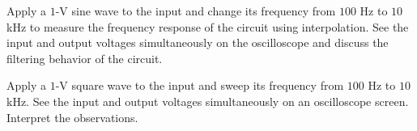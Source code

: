 \documentclass[11pt]{article}
\begin{document}
\begin{question}
    \begin{subquestion}{Apply a $1$-V sine wave to the input and change its frequency from $100$ Hz to $10$ kHz to measure the frequency response of the circuit using interpolation. See the input and output voltages simultaneously on the oscilloscope and discuss the filtering behavior of the circuit.}
        \answer{}
    \end{subquestion}

    \begin{subquestion}{Apply a $1$-V square wave to the input and sweep its frequency from $100$ Hz to $10$ kHz. See the input and output voltages simultaneously on an oscilloscope screen. Interpret the observations.}
        \answer{}
    \end{subquestion}

\end{question}



\end{document}
